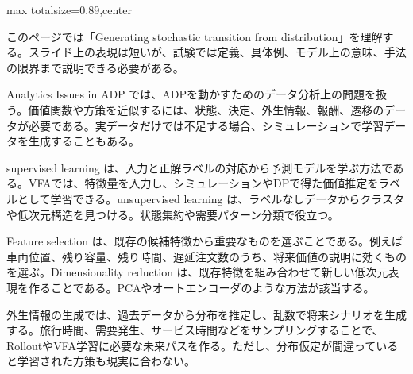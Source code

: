\begin{minipage}[t]{0.58\textwidth}
\begin{adjustbox}{max totalsize={\textwidth}{0.89\textheight},center}
\begin{minipage}{\textwidth}\scriptsize
{}このページでは「Generating stochastic transition from distribution」を理解する。スライド上の表現は短いが、試験では定義、具体例、モデル上の意味、手法の限界まで説明できる必要がある。\par
Analytics Issues in ADP では、ADPを動かすためのデータ分析上の問題を扱う。価値関数や方策を近似するには、状態、決定、外生情報、報酬、遷移のデータが必要である。実データだけでは不足する場合、シミュレーションで学習データを生成することもある。\par
supervised learning は、入力と正解ラベルの対応から予測モデルを学ぶ方法である。VFAでは、特徴量を入力し、シミュレーションやDPで得た価値推定をラベルとして学習できる。unsupervised learning は、ラベルなしデータからクラスタや低次元構造を見つける。状態集約や需要パターン分類で役立つ。\par
Feature selection は、既存の候補特徴から重要なものを選ぶことである。例えば車両位置、残り容量、残り時間、遅延注文数のうち、将来価値の説明に効くものを選ぶ。Dimensionality reduction は、既存特徴を組み合わせて新しい低次元表現を作ることである。PCAやオートエンコーダのような方法が該当する。\par
外生情報の生成では、過去データから分布を推定し、乱数で将来シナリオを生成する。旅行時間、需要発生、サービス時間などをサンプリングすることで、RolloutやVFA学習に必要な未来パスを作る。ただし、分布仮定が間違っていると学習された方策も現実に合わない。\par

\end{minipage}
\end{adjustbox}
\end{minipage}
